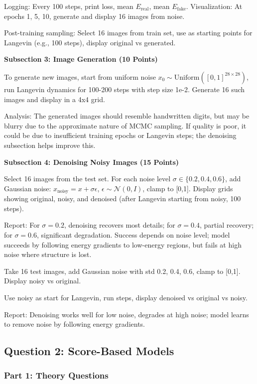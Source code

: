 \documentclass[a4paper,12pt]{article}
\begin{document}
Logging: Every 100 steps, print loss, mean $E_{\text{real}}$, mean $E_{\text{fake}}$. Visualization: At epochs 1, 5, 10, generate and display 16 images from noise.

Post-training sampling: Select 16 images from train set, use as starting points for Langevin (e.g., 100 steps), display original vs generated.

\textbf{Subsection 3: Image Generation (10 Points)}

To generate new images, start from uniform noise $x_0 \sim \text{Uniform}([0,1]^{28\times28})$, run Langevin dynamics for 100-200 steps with step size 1e-2. Generate 16 such images and display in a 4x4 grid.

Analysis: The generated images should resemble handwritten digits, but may be blurry due to the approximate nature of MCMC sampling. If quality is poor, it could be due to insufficient training epochs or Langevin steps; the denoising subsection helps improve this.

\textbf{Subsection 4: Denoising Noisy Images (15 Points)}

Select 16 images from the test set. For each noise level $\sigma \in \{0.2, 0.4, 0.6\}$, add Gaussian noise: $x_{\text{noisy}} = x + \sigma \epsilon$, $\epsilon \sim \mathcal{N}(0,I)$, clamp to [0,1]. Display grids showing original, noisy, and denoised (after Langevin starting from noisy, 100 steps).

Report: For $\sigma=0.2$, denoising recovers most details; for $\sigma=0.4$, partial recovery; for $\sigma=0.6$, significant degradation. Success depends on noise level; model succeeds by following energy gradients to low-energy regions, but fails at high noise where structure is lost.

Take 16 test images, add Gaussian noise with std 0.2, 0.4, 0.6, clamp to [0,1]. Display noisy vs original.

Use noisy as start for Langevin, run steps, display denoised vs original vs noisy.

Report: Denoising works well for low noise, degrades at high noise; model learns to remove noise by following energy gradients.

\subsection{Question 2: Score-Based Models}

\subsubsection{Part 1: Theory Questions}
\end{document}
